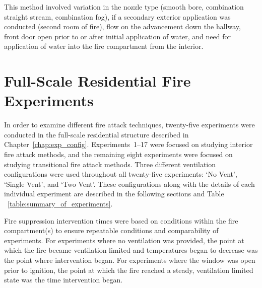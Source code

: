 \documentclass[12pt,oneside]{book}
\begin{document}
This method involved variation in the nozzle type (smooth bore, combination straight stream, combination fog), if a secondary exterior application was conducted (second room of fire), flow on the advancement down the hallway, front door open prior to or after initial application of water, and need for application of water into the fire compartment from the interior. 

\chapter{Full-Scale Residential Fire Experiments}

In order to examine different fire attack techniques, twenty-five experiments were conducted in the full-scale residential structure described in Chapter~\ref{chap:exp_config}. Experiments~1--17 were focused on studying interior fire attack methods, and the remaining eight experiments were focused on studying transitional fire attack methods. Three different ventilation configurations were used throughout all twenty-five experiments: `No Vent', `Single Vent', and `Two Vent'. These configurations along with the details of each individual experiment are described in the following sections and Table ~\ref{table:summary_of_experiments}.  

Fire suppression intervention times were based on conditions within the fire compartment(s) to ensure repeatable conditions and comparability of experiments. For experiments where no ventilation was provided, the point at which the fire became ventilation limited and temperatures began to decrease was the point where intervention began. For experiments where the window was open prior to ignition, the point at which the fire reached a steady, ventilation limited state was the time intervention began.
\end{document}
